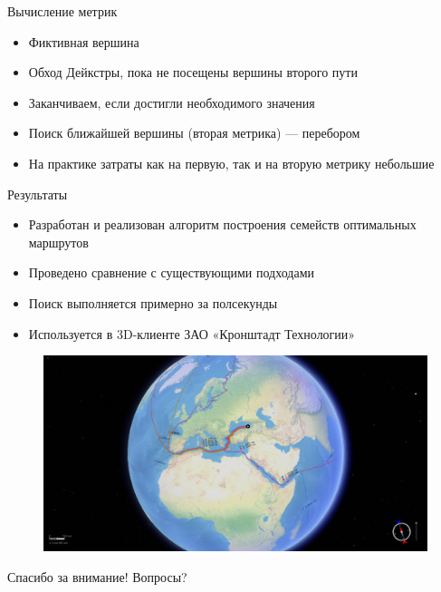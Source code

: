 \documentclass[mathserif]{beamer}
\begin{document}
\begin{frame}{Вычисление метрик}
    \begin{itemize}
        \item Фиктивная вершина
        \item Обход Дейкстры, пока не посещены вершины второго пути 
        \item Заканчиваем, если достигли необходимого значения
        \item Поиск ближайшей вершины (вторая метрика) — перебором
        \item На практике затраты как на первую, так и на вторую
          метрику небольшие
    \end{itemize}
\end{frame}

\begin{frame}{Результаты}
     {
        \begin{itemize}
            \item Разработан и реализован алгоритм построения семейств оптимальных маршрутов 
            \item Проведено сравнение с существующими подходами 
            \item Поиск выполняется примерно за полсекунды 
            \item Используется в 3D-клиенте ЗАО «Кронштадт Технологии»
        \end{itemize}
    }
     {
        \begin{figure}
            \includegraphics[width=\textwidth]{results}
        \end{figure}
    }
\end{frame}

\begin{frame}{Спасибо за внимание!}
    Вопросы?
\end{frame}
\end{document}
